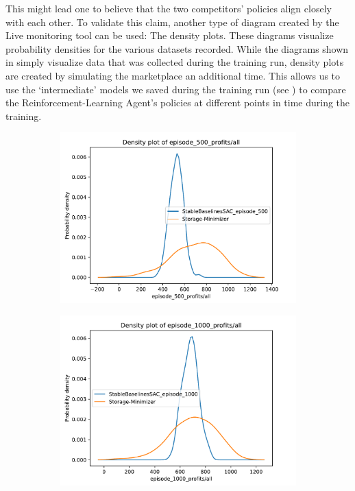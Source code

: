 This might lead one to believe that the two competitors' policies align closely with each other. To validate this claim, another type of diagram created by the Live monitoring tool can be used: The density plots. These diagrams visualize probability densities for the various datasets recorded. While the diagrams shown in  simply visualize data that was collected during the training run, density plots are created by simulating the marketplace an additional time. This allows us to use the `intermediate' models we saved during the training run (see ) to compare the Reinforcement-Learning Agent's policies at different points in time during the training.

\begin{figure}
	\centering
	\begin{subfigure}{0.49\textwidth}
		\centering
		\includegraphics[width = \textwidth]{images/experiments/SACDuopoly/SACDuopolyProfitsDensity1.pdf}\\[1 ex]
		\label{fig:SACDuopolyProfitsDensity1}
	\end{subfigure}
	\begin{subfigure}{0.49\textwidth}
		\centering
		\includegraphics[width = \textwidth]{images/experiments/SACDuopoly/SACDuopolyProfitsDensity2.pdf}\\[1 ex]

\end{subfigure}
\end{figure}
